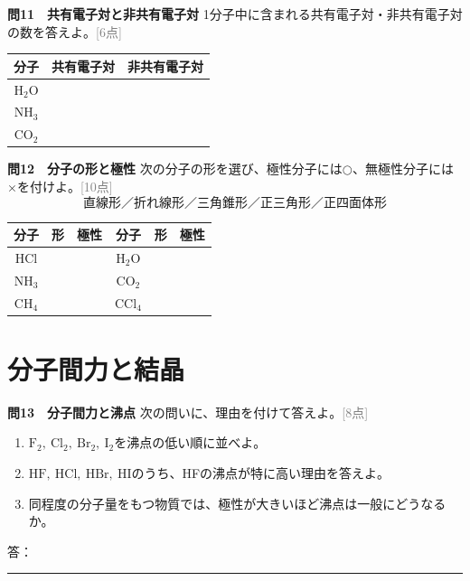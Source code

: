 \documentclass[11pt,a4paper]{ctexart}
\newcommand{\blank}[1]{\rule{#1}{0.4pt}}
\newcommand{\score}[1]{\hfill\textcolor{gray}{[#1点]}}
\newcommand{\ansspace}[1]{\par\vspace{#1}}
\newenvironment{qbox}{\begin{list}{}{\setlength{\leftmargin}{0pt}}\item\begin{minipage}{\linewidth}}{\end{minipage}\end{list}\vspace{3mm}}
\begin{document}
\begin{qbox}
\textbf{問11　共有電子対と非共有電子対}
\quad 1分子中に含まれる共有電子対・非共有電子対の数を答えよ。\score{6}
\begin{center}
\begin{tabular}{c|c|c}
\toprule
分子 & 共有電子対 & 非共有電子対\\ \midrule
$\mathrm{H_2O}$ &&\\
$\mathrm{NH_3}$ &&\\
$\mathrm{CO_2}$ &&\\
\bottomrule
\end{tabular}
\end{center}
\end{qbox}

\begin{qbox}
\textbf{問12　分子の形と極性}
\quad 次の分子の形を選び、極性分子には$\bigcirc$、無極性分子には$\times$を付けよ。\score{10}
\[
\text{直線形／折れ線形／三角錐形／正三角形／正四面体形}
\]
\begin{center}
\renewcommand{\arraystretch}{1.55}
\begin{tabular}{c|c|c@{\qquad}c|c|c}
\toprule
分子&形&極性&分子&形&極性\\ \midrule
$\mathrm{HCl}$&&&$\mathrm{H_2O}$&&\\
$\mathrm{NH_3}$&&&$\mathrm{CO_2}$&&\\
$\mathrm{CH_4}$&&&$\mathrm{CCl_4}$&&\\
\bottomrule
\end{tabular}
\end{center}
\end{qbox}

\section{分子間力と結晶}

\begin{qbox}
\textbf{問13　分子間力と沸点}
\quad 次の問いに、理由を付けて答えよ。\score{8}
\begin{enumerate}[label=(\arabic*),leftmargin=9mm]
\item $\mathrm{F_2,\ Cl_2,\ Br_2,\ I_2}$を沸点の低い順に並べよ。
\item $\mathrm{HF,\ HCl,\ HBr,\ HI}$のうち、HFの沸点が特に高い理由を答えよ。
\item 同程度の分子量をもつ物質では、極性が大きいほど沸点は一般にどうなるか。
\end{enumerate}
答：\blank{150mm}\ansspace{7mm}
\end{qbox}
\end{document}
